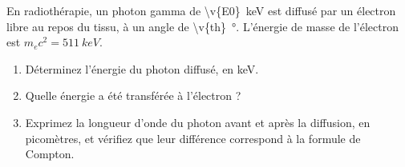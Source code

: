 En radiothérapie, un photon gamma de \qty{\v{E0}}{keV} est diffusé par un électron libre au repos du tissu, à un angle de \qty{\v{th}}{\degree}. L'énergie de masse de l'électron est $m_e c^2 = \qty{511}{keV}$.

\begin{enumerate}[label=\alph*)]
    \item Déterminez l'énergie du photon diffusé, en keV.
    \item Quelle énergie a été transférée à l'électron ?
    \item Exprimez la longueur d'onde du photon avant et après la diffusion, en picomètres, et vérifiez que leur différence correspond à la formule de Compton.
\end{enumerate}
